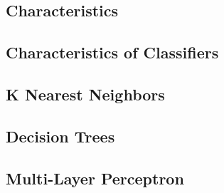 \subsection{Characteristics}

\subsection{Characteristics of Classifiers}

\subsection{K Nearest Neighbors}

\subsection{Decision Trees}

\subsection{Multi-Layer Perceptron}